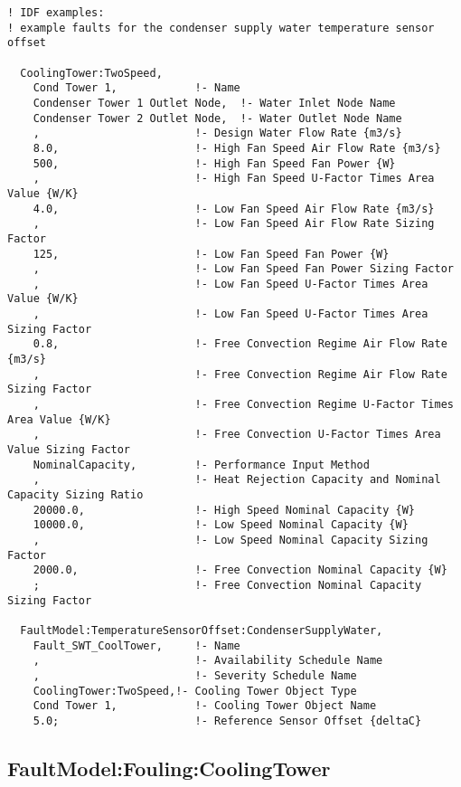 \begin{lstlisting}
! IDF examples:
! example faults for the condenser supply water temperature sensor offset

  CoolingTower:TwoSpeed,
    Cond Tower 1,            !- Name
    Condenser Tower 1 Outlet Node,  !- Water Inlet Node Name
    Condenser Tower 2 Outlet Node,  !- Water Outlet Node Name
    ,                        !- Design Water Flow Rate {m3/s}
    8.0,                     !- High Fan Speed Air Flow Rate {m3/s}
    500,                     !- High Fan Speed Fan Power {W}
    ,                        !- High Fan Speed U-Factor Times Area Value {W/K}
    4.0,                     !- Low Fan Speed Air Flow Rate {m3/s}
    ,                        !- Low Fan Speed Air Flow Rate Sizing Factor
    125,                     !- Low Fan Speed Fan Power {W}
    ,                        !- Low Fan Speed Fan Power Sizing Factor
    ,                        !- Low Fan Speed U-Factor Times Area Value {W/K}
    ,                        !- Low Fan Speed U-Factor Times Area Sizing Factor
    0.8,                     !- Free Convection Regime Air Flow Rate {m3/s}
    ,                        !- Free Convection Regime Air Flow Rate Sizing Factor
    ,                        !- Free Convection Regime U-Factor Times Area Value {W/K}
    ,                        !- Free Convection U-Factor Times Area Value Sizing Factor
    NominalCapacity,         !- Performance Input Method
    ,                        !- Heat Rejection Capacity and Nominal Capacity Sizing Ratio
    20000.0,                 !- High Speed Nominal Capacity {W}
    10000.0,                 !- Low Speed Nominal Capacity {W}
    ,                        !- Low Speed Nominal Capacity Sizing Factor
    2000.0,                  !- Free Convection Nominal Capacity {W}
    ;                        !- Free Convection Nominal Capacity Sizing Factor

  FaultModel:TemperatureSensorOffset:CondenserSupplyWater,
    Fault_SWT_CoolTower,     !- Name
    ,                        !- Availability Schedule Name
    ,                        !- Severity Schedule Name
    CoolingTower:TwoSpeed,!- Cooling Tower Object Type
    Cond Tower 1,            !- Cooling Tower Object Name
    5.0;                     !- Reference Sensor Offset {deltaC}

\end{lstlisting}


\subsection{FaultModel:Fouling:CoolingTower}\label{faultmodelfoulingcoolingtower}

